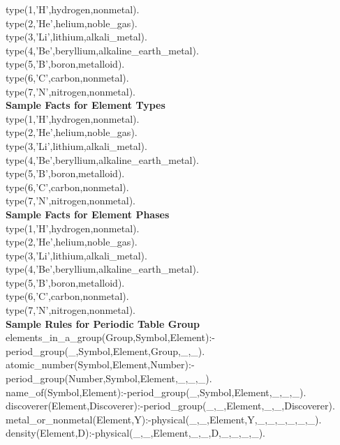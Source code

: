 \documentclass{article}
\begin{document}
type(1,'H',hydrogen,nonmetal).\\
type(2,'He',helium,noble\_gas).\\
type(3,'Li',lithium,alkali\_metal).\\
type(4,'Be',beryllium,alkaline\_earth\_metal).\\
type(5,'B',boron,metalloid).\\
type(6,'C',carbon,nonmetal).\\
type(7,'N',nitrogen,nonmetal).\\
\newline
\textbf{Sample Facts for Element Types}\\
\newline
type(1,'H',hydrogen,nonmetal).\\
type(2,'He',helium,noble\_gas).\\
type(3,'Li',lithium,alkali\_metal).\\
type(4,'Be',beryllium,alkaline\_earth\_metal).\\
type(5,'B',boron,metalloid).\\
type(6,'C',carbon,nonmetal).\\
type(7,'N',nitrogen,nonmetal).\\
\newline
\textbf{Sample Facts for Element Phases}\\
\newline
type(1,'H',hydrogen,nonmetal).\\
type(2,'He',helium,noble\_gas).\\
type(3,'Li',lithium,alkali\_metal).\\
type(4,'Be',beryllium,alkaline\_earth\_metal).\\
type(5,'B',boron,metalloid).\\
type(6,'C',carbon,nonmetal).\\
type(7,'N',nitrogen,nonmetal).\\
\newline
\textbf{Sample Rules for Periodic Table Group}\\
\newline
elements\_in\_a\_group(Group,Symbol,Element):-period\_group(\_,Symbol,Element,Group,\_,\_).\\
atomic\_number(Symbol,Element,Number):-period\_group(Number,Symbol,Element,\_,\_,\_).\\
name\_of(Symbol,Element):-period\_group(\_,Symbol,Element,\_,\_,\_).\\
discoverer(Element,Discoverer):-period\_group(\_,\_,Element,\_,\_,Discoverer).\\
metal\_or\_nonmetal(Element,Y):-physical(\_,\_,Element,Y,\_,\_,\_,\_,\_,\_).\\
density(Element,D):-physical(\_,\_,Element,\_,\_,D,\_,\_,\_,\_).\\
\end{document}
